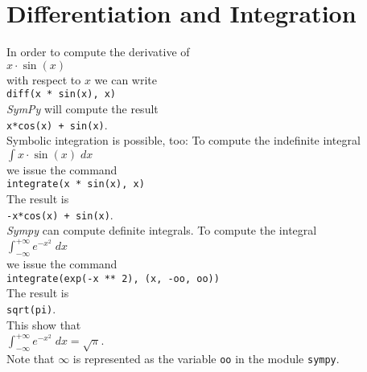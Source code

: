 \documentclass{report}
\begin{document}
\section{Differentiation and Integration}
In order to compute the derivative of
\\[0.2cm]
\hspace*{1.3cm}
$x \cdot \sin(x)$
\\[0.2cm]
with respect to $x$ we can write
\\[0.2cm]
\hspace*{1.3cm}
\texttt{diff(x * sin(x), x)}
\\[0.2cm]
\textsl{SymPy} will compute the result
\\[0.2cm]
\hspace*{1.3cm}
\texttt{x*cos(x) + sin(x)}.
\\[0.2cm]
Symbolic integration is possible, too:  To compute the indefinite integral
\\[0.2cm]
\hspace*{1.3cm}
$\displaystyle\int x \cdot \sin(x)\; dx$
\\[0.2cm]
we issue the command
\\[0.2cm]
\hspace*{1.3cm}
\texttt{integrate(x * sin(x), x)}
\\[0.2cm]
The result is
\\[0.2cm]
\hspace*{1.3cm}
\texttt{-x*cos(x) + sin(x)}.
\\[0.2cm]
\textsl{Sympy} can compute definite integrals.  To compute the integral
\\[0.2cm]
\hspace*{1.3cm}
$\displaystyle\int_{-\infty}^{+\infty} e^{-x^2} \; dx$
\\[0.2cm]
we issue the command
\\[0.2cm]
\hspace*{1.3cm}
\texttt{integrate(exp(-x ** 2), (x, -oo, oo))}
\\[0.2cm]
The result is
\\[0.2cm]
\hspace*{1.3cm}
\texttt{sqrt(pi)}.
\\[0.2cm]
This show that
\\[0.2cm]
\hspace*{1.3cm}
$\displaystyle\int_{-\infty}^{+\infty} e^{-x^2} \; dx = \sqrt{\pi}$.
\\[0.2cm]
Note that $\infty$ is represented as the variable \texttt{oo} in the module \texttt{sympy}.  
\end{document}
